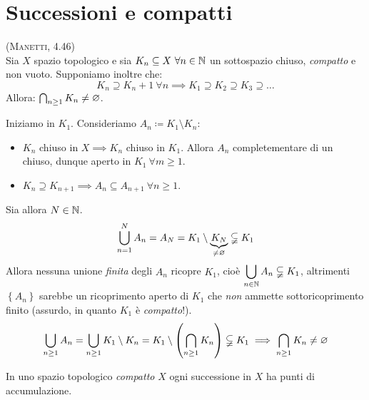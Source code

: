 \section{Successioni e compatti}
\begin{proposition}\label{compattocontenuto}\textsc{(Manetti, 4.46)}\\
Sia $X$ spazio topologico e sia $K_n\subseteq X\ \forall n\in\naturalset$ un sottospazio chiuso, \textit{compatto} e non vuoto. Supponiamo inoltre che:
\begin{equation*}
K_n\supseteq K_n+1\ \forall n\implies K_1\supseteq K_2\supseteq K_3\supseteq \ldots
\end{equation*}
Allora: $\mathop{{\bigcap}}\displaylimits_{n\geq 1}K_n\neq\varnothing$.
\end{proposition}
\begin{demonstration}
Iniziamo in $K_1$. Consideriamo $A_n\coloneqq K_1\setminus K_n$:
\begin{itemize}
	\item $K_n$ chiuso in $X\implies K_n$ chiuso in $K_1$. Allora $A_n$ completementare di un chiuso, dunque aperto in $K_1\ \forall m\geq 1$.
	\item $K_n\supseteq K_{n+1}\implies A_n\subseteq A_{n+1}\ \forall n\geq 1$.
\end{itemize}
Sia allora $N\in\mathbb{N}$.
\begin{equation*}
	\mathop{{\bigcup}}\displaylimits_{n=1}^{N}A_n=A_N=K_1\setminus \underbrace{K_N}_{\neq\varnothing}\subsetneqq K_1
\end{equation*}
Allora nessuna unione \textit{finita} degli $A_n$ ricopre $K_1$, cioè $\displaystyle \mathop{{\bigcup}}\displaylimits_{n\in\mathbb{N}}A_n\subsetneqq K_1$, altrimenti $\left\{A_n\right\}$ sarebbe un ricoprimento aperto di $K_1$ che \textit{non} ammette sottoricoprimento finito (assurdo, in quanto $K_1$ è \textit{compatto}!).
\begin{equation*}
\mathop{{\bigcup}}\displaylimits_{n\geq 1}A_n=\mathop{{\bigcup}}\displaylimits_{n\geq 1}K_1\setminus K_n=K_1\setminus \left(\mathop{{\bigcap}}\displaylimits_{n\geq 1}K_n\right)\subsetneqq K_1\implies \mathop{{\bigcap}}\displaylimits_{n\geq 1}K_n\neq\varnothing
\end{equation*}
\vspace{-6mm}
\end{demonstration}
\begin{lemming}
In uno spazio topologico \textit{compatto} $X$ ogni successione in $X$ ha punti di accumulazione.
\end{lemming}
